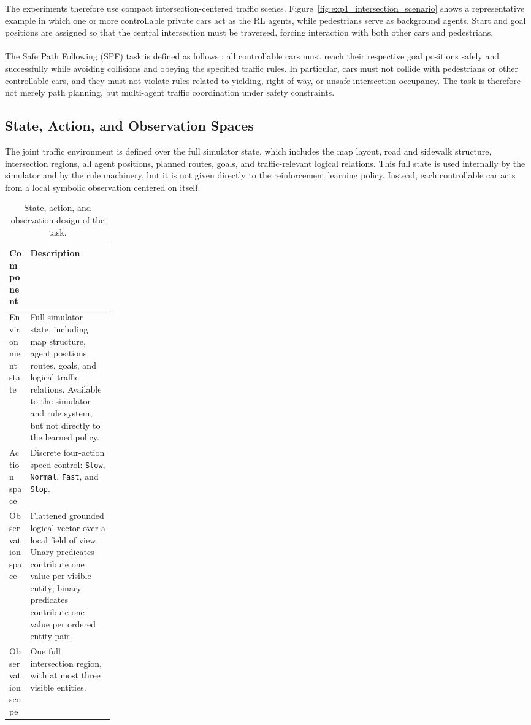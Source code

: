 \noindent The experiments therefore use compact intersection-centered traffic scenes. Figure~\ref{fig:exp1_intersection_scenario} shows a representative example in which one or more controllable private cars act as the RL agents, while pedestrians serve as background agents. Start and goal positions are assigned so that the central intersection must be traversed, forcing interaction with both other cars and pedestrians.
\\
\\
The Safe Path Following (SPF) task is defined as follows \cite{li2025logicityadvancingneurosymbolicai}: all controllable cars must reach their respective goal positions safely and successfully while avoiding collisions and obeying the specified traffic rules. In particular, cars must not collide with pedestrians or other controllable cars, and they must not violate rules related to yielding, right-of-way, or unsafe intersection occupancy. The task is therefore not merely path planning, but multi-agent traffic coordination under safety constraints.

\subsection{State, Action, and Observation Spaces}
The joint traffic environment is defined over the full simulator state, which includes the map layout, road and sidewalk structure, intersection regions, all agent positions, planned routes, goals, and traffic-relevant logical relations. This full state is used internally by the simulator and by the rule machinery, but it is not given directly to the reinforcement learning policy. Instead, each controllable car acts from a local symbolic observation centered on itself.

\begin{table}[H]
\centering
\small
\caption{State, action, and observation design of the task.}
\label{tab:state-action-observation}
\begin{tabularx}{\linewidth}{@{}p{0.2\linewidth} X@{}}
\toprule
\textbf{Component} & \textbf{Description} \\
\midrule
Environment state & Full simulator state, including map structure, agent positions, routes, goals, and logical traffic relations. Available to the simulator and rule system, but not directly to the learned policy. \\
\addlinespace
Action space & Discrete four-action speed control: \texttt{Slow}, \texttt{Normal}, \texttt{Fast}, and \texttt{Stop}. \\
\addlinespace
Observation space & Flattened grounded logical vector over a local field of view. Unary predicates contribute one value per visible entity; binary predicates contribute one value per ordered entity pair. \\
\addlinespace
Observation scope & One full intersection region, with at most three visible entities. \\
\bottomrule
\end{tabularx}
\end{table}

